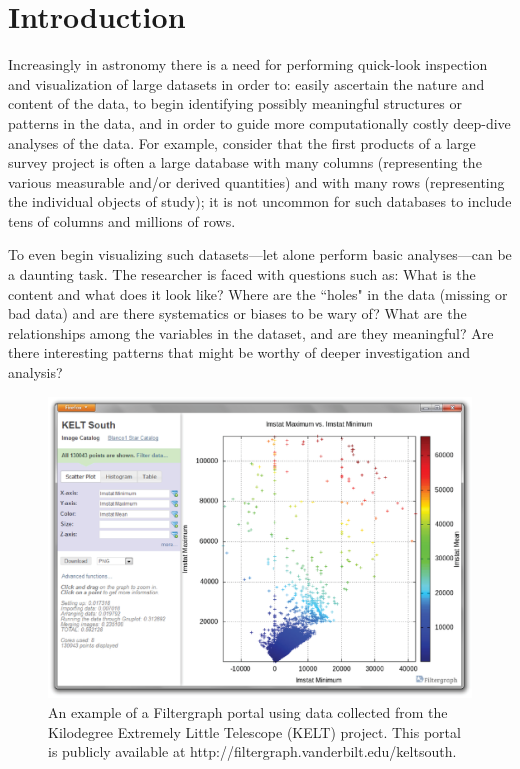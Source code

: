 \section{Introduction}
Increasingly in astronomy there is a need for performing quick-look inspection and visualization of large datasets in order to: easily ascertain the nature and content of the data, to begin identifying possibly meaningful structures or patterns in the data, and in order to guide more computationally costly deep-dive analyses of the data. For example, consider that the first products of a large survey project is often a large database with many columns (representing the various measurable and/or derived quantities) and with many rows (representing the individual objects of study); it is not uncommon for such databases to include tens of columns and millions of rows.

To even begin visualizing such datasets---let alone perform basic analyses---can be a daunting task. The researcher is faced with questions such as: What is the content and what does it look like? Where are the ``holes" in the data (missing or bad data) and are there systematics or biases to be wary of? What are the relationships among the variables in the dataset, and are they meaningful? Are there interesting patterns that might be worthy of deeper investigation and analysis?

\begin{figure}
\includegraphics[width=120mm]{part11/Burger_F2/F2_f1.eps}
\caption{An example of a Filtergraph portal using data collected from the Kilodegree Extremely Little Telescope (KELT) project. This portal is publicly available at http://filtergraph.vanderbilt.edu/keltsouth.}
\end{figure}

